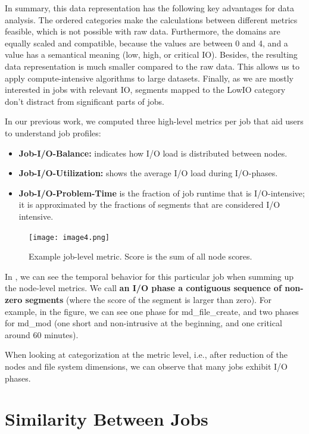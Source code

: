 \documentclass{jhps}
\begin{document}
In summary, this data representation has the following key advantages for data analysis.
The ordered categories make the calculations between different metrics feasible, which is not possible with raw data.
Furthermore, the domains are equally scaled and compatible, because the values are between 0 and 4, and a value has a semantical meaning (low, high, or critical IO).
Besides, the resulting data representation is much smaller compared to the raw data.
This allows us to apply compute-intensive algorithms to large datasets.
Finally, as we are mostly interested in jobs with relevant IO, segments mapped to the LowIO category don't distract from significant parts of jobs.

In our previous work, we computed three high-level metrics per job that aid users to understand job profiles:

\begin{itemize}
	\item \textbf{Job-I/O-Balance:} indicates how I/O load is distributed between nodes.
	\item \textbf{Job-I/O-Utilization:} shows the average I/O load during I/O-phases.
	\item \textbf{Job-I/O-Problem-Time} is the fraction of job runtime that is I/O-intensive; it is approximated by the fractions of segments that are considered I/O intensive.
\end{itemize}

\begin{figure}[!bt]
	\centering
	\texttt{[image: image4.png]}
	\caption{Example job-level metric.
Score is the sum of all node scores.}
	\label{fig:seg_example}
\end{figure}

In , we can see the temporal behavior for this particular job when summing up the node-level metrics.
We call \textbf{an I/O phase a contiguous sequence of non-zero segments} (where the score of the segment is larger than zero).
For example, in the figure, we can see one phase for md\_file\_create, and two phases for md\_mod (one short and non-intrusive at the beginning, and one critical around 60 minutes).

When looking at categorization at the metric level, i.e., after reduction of the nodes and file system dimensions, we can observe that many jobs exhibit I/O phases.

\section{Similarity Between Jobs}%
\label{sec:job_similarity}
\end{document}

